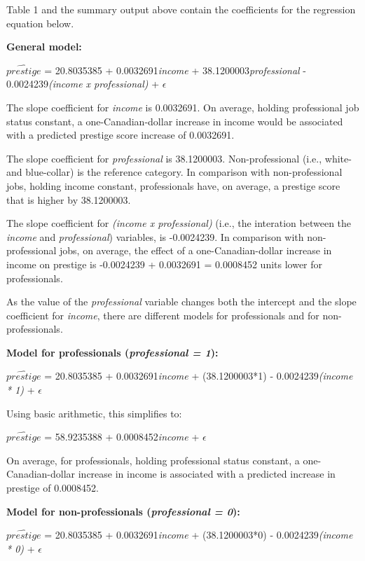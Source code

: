 \documentclass[12pt,letterpaper]{article}
\begin{document}
\begin{enumerate}
	Table 1 and the summary output above contain the coefficients for the regression equation below. \vspace{.5cm}
	
\textbf{General model:}
	
	$\hat{prestige}$ = 20.8035385 + 0.0032691\textit{income} + 38.1200003\textit{professional} - 0.0024239\textit{(income x professional)} + $\epsilon$
	
	The slope coefficient for \textit{income} is 0.0032691. On average, holding professional job status constant, a one-Canadian-dollar increase in income would be associated with a predicted prestige score increase of 0.0032691. 
	
	The slope coefficient for \textit{professional} is 38.1200003. Non-professional (i.e., white- and blue-collar) is the reference category. In comparison with non-professional jobs, holding income constant, professionals have, on average, a prestige score that is higher by 38.1200003. 
	
	The slope coefficient for \textit{(income x professional)} (i.e., the interation between the \textit{income} and \textit{professional}) variables, is -0.0024239. In comparison with non-professional jobs, on average, the effect of a one-Canadian-dollar increase in income on prestige is -0.0024239 + 0.0032691 = 0.0008452 units lower for professionals. 
	
	\vspace{.5cm} As the value of the \textit{professional} variable changes both the intercept and the slope coefficient for \textit{income}, there are different models for professionals and for non-professionals. 	
	
\textbf{Model for professionals (\textit{professional = 1}):}
	
	$\hat{prestige}$ = 20.8035385 + 0.0032691\textit{income} + (38.1200003*1) - 0.0024239\textit{(income * 1)} + $\epsilon$
	
	Using basic arithmetic, this simplifies to:
	
	$\hat{prestige}$ = 58.9235388 + 0.0008452\textit{income} + $\epsilon$
	
	On average, for professionals, holding professional status constant, a one-Canadian-dollar increase in income is associated with a predicted increase in prestige of 0.0008452.
	
		\vspace{.5cm} \textbf{Model for non-professionals (\textit{professional = 0}):} 
	
	$\hat{prestige}$ = 20.8035385 + 0.0032691\textit{income} + (38.1200003*0) - 0.0024239\textit{(income * 0)} + $\epsilon$
	

\end{enumerate}
\end{document}
